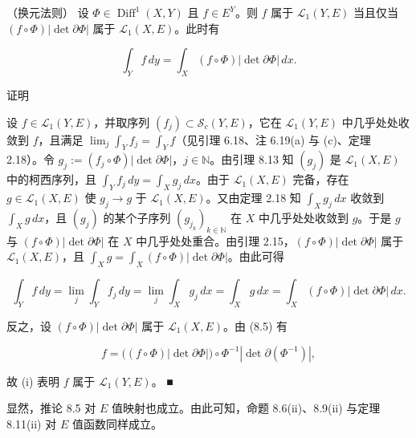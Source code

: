 \begin{theorem}

（换元法则） 设 $ \Phi\in\operatorname{Diff}^1(X,Y) $ 且 $ f\in E^Y $。则 $ f $ 属于 $ \mathcal{L}_1(Y,E) $ 当且仅当 $ (f\circ\Phi)|\det\partial\Phi| $ 属于 $ \mathcal{L}_1(X,E) $。此时有

\[
\int_Y f\,dy=\int_X (f\circ\Phi)|\det\partial\Phi|\,dx .
\]

证明

\begin{subitems}
\item

设 $ f\in\mathcal{L}_1(Y,E) $，并取序列 $ (f_j)\subset\mathcal{S}_c(Y,E) $，它在 $ \mathcal{L}_1(Y,E) $ 中几乎处处收敛到 $ f $，且满足 $ \lim_{j}\int_Y f_j=\int_Y f $（见引理 6.18、注 6.19(a) 与 (c)、定理 2.18）。令 $ g_j:=(f_j\circ\Phi)|\det\partial\Phi| $，$ j\in\mathbb{N} $。由引理 8.13 知 $ (g_j) $ 是 $ \mathcal{L}_1(X,E) $ 中的柯西序列，且 $ \int_Y f_j\,dy=\int_X g_j\,dx $。由于 $ \mathcal{L}_1(X,E) $ 完备，存在 $ g\in\mathcal{L}_1(X,E) $ 使 $ g_j\to g $ 于 $ \mathcal{L}_1(X,E) $。又由定理 2.18 知 $ \int_X g_j\,dx $ 收敛到 $ \int_X g\,dx $，且 $ (g_j) $ 的某个子序列 $ (g_{j_k})_{k\in\mathbb{N}} $ 在 $ X $ 中几乎处处收敛到 $ g $。于是 $ g $ 与 $ (f\circ\Phi)|\det\partial\Phi| $ 在 $ X $ 中几乎处处重合。由引理 2.15，$ (f\circ\Phi)|\det\partial\Phi| $ 属于 $ \mathcal{L}_1(X,E) $，且 $ \int_X g=\int_X (f\circ\Phi)|\det\partial\Phi| $。由此可得

\[
\int_Y f\,dy=\lim_{j}\int_Y f_j\,dy=\lim_{j}\int_X g_j\,dx=\int_X g\,dx=\int_X (f\circ\Phi)|\det\partial\Phi|\,dx .
\]
\item

反之，设 $ (f\circ\Phi)|\det\partial\Phi| $ 属于 $ \mathcal{L}_1(X,E) $。由 (8.5) 有

\[
f=\big((f\circ\Phi)|\det\partial\Phi|\big)\circ\Phi^{-1}|\det\partial(\Phi^{-1})| ,
\]

故 (i) 表明 $ f $ 属于 $ \mathcal{L}_1(Y,E) $。 \nobreak\hspace{0.35em}■

\end{subitems}

\end{theorem}

显然，推论 8.5 对 $ E $ 值映射也成立。由此可知，命题 8.6(ii)、8.9(ii) 与定理 8.11(ii) 对 $ E $ 值函数同样成立。

\exerciseshead

